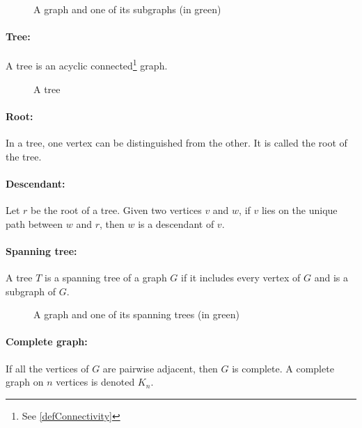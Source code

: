 \begin{figure}[!h]
  \caption{A graph and one of its subgraphs (in green)}
  \begin{center}
    
  \end{center}
\end{figure}

\paragraph{Tree:}
A tree is an acyclic connected\footnote{See \ref{defConnectivity}} graph.

\begin{figure}[!h]
  \caption{A tree}
  \begin{center}
    
  \end{center}
\end{figure}

\paragraph{Root:}
In a tree, one vertex can be distinguished from the other. It is called the root
of the tree.

\paragraph{Descendant:}
Let $r$ be the root of a tree.
Given two vertices $v$ and $w$, if $v$ lies on the unique path between $w$ and 
$r$, then $w$ is a descendant of $v$.

\paragraph{Spanning tree:}
A tree $T$ is a spanning tree of a graph $G$ if it includes every vertex of $G$ 
and is a subgraph of $G$.

\begin{figure}[!h]
  \caption{A graph and one of its spanning trees (in green)}
  \begin{center}
    
  \end{center}
\end{figure}

\paragraph{Complete graph:}
If all the vertices of $G$ are pairwise adjacent, then $G$ is complete. A
complete graph on $n$ vertices is denoted $K_n$.

